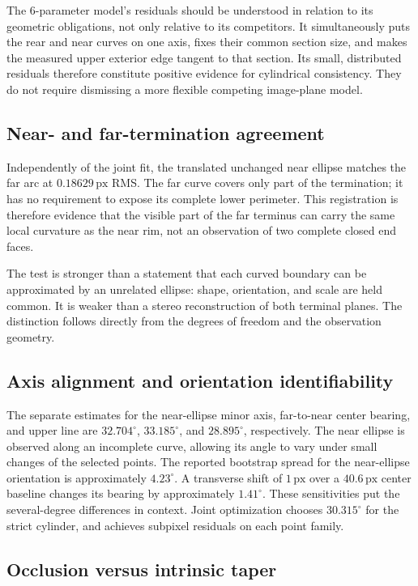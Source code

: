 \documentclass[11pt,letterpaper]{article}
\newcommand{\px}{\,\mathrm{px}}
\begin{document}
The 6-parameter model's residuals should be understood in relation to its geometric obligations, not only relative to its competitors. It simultaneously puts the rear and near curves on one axis, fixes their common section size, and makes the measured upper exterior edge tangent to that section. Its small, distributed residuals therefore constitute positive evidence for cylindrical consistency. They do not require dismissing a more flexible competing image-plane model.

\subsection{Near- and far-termination agreement}

Independently of the joint fit, the translated unchanged near ellipse matches the far arc at \(0.18629\px\) RMS. The far curve covers only part of the termination; it has no requirement to expose its complete lower perimeter. This registration is therefore evidence that the visible part of the far terminus can carry the same local curvature as the near rim, not an observation of two complete closed end faces.

The test is stronger than a statement that each curved boundary can be approximated by an unrelated ellipse: shape, orientation, and scale are held common. It is weaker than a stereo reconstruction of both terminal planes. The distinction follows directly from the degrees of freedom and the observation geometry.

\subsection{Axis alignment and orientation identifiability}

The separate estimates for the near-ellipse minor axis, far-to-near center bearing, and upper line are \(32.704^\circ\), \(33.185^\circ\), and \(28.895^\circ\), respectively. The near ellipse is observed along an incomplete curve, allowing its angle to vary under small changes of the selected points. The reported bootstrap spread for the near-ellipse orientation is approximately \(4.23^\circ\). A transverse shift of \(1\px\) over a \(40.6\px\) center baseline changes its bearing by approximately \(1.41^\circ\). These sensitivities put the several-degree differences in context. Joint optimization chooses \(30.315^\circ\) for the strict cylinder, and achieves subpixel residuals on each point family.

\subsection{Occlusion versus intrinsic taper}
\end{document}
